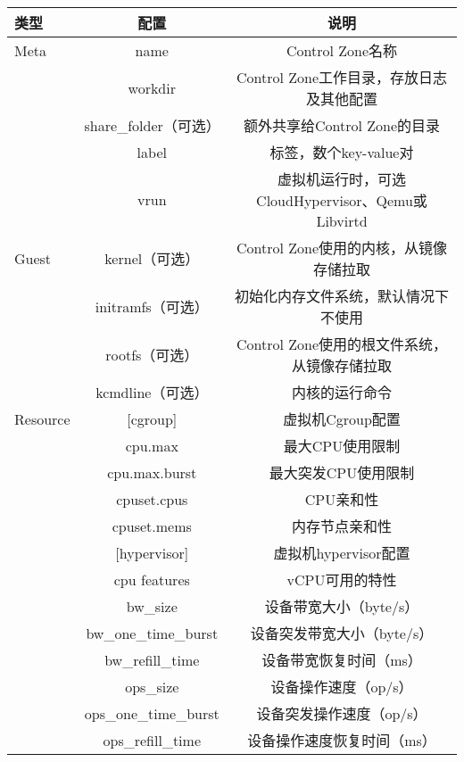 \begin{table}
    \label{tab:cz_config}
    \footnotesize%
    \setlength{\tabcolsep}{4pt}%
    \renewcommand{\arraystretch}{1.5}%
    \centering
    \begin{tabular}{lcc}
        \hline
        类型 & 配置 & 说明\\
        \hline
        Meta & name & Control Zone名称 \\
        & workdir & Control Zone工作目录，存放日志及其他配置 \\
        & share\_folder（可选） & 额外共享给Control Zone的目录 \\
        & label & 标签，数个key-value对 \\
        & vrun & 虚拟机运行时，可选CloudHypervisor、Qemu或Libvirtd \\
        Guest & kernel（可选） & Control Zone使用的内核，从镜像存储拉取 \\
        & initramfs（可选） & 初始化内存文件系统，默认情况下不使用 \\
        & rootfs（可选） & Control Zone使用的根文件系统，从镜像存储拉取\\
        & kcmdline（可选） & 内核的运行命令 \\
        Resource & [cgroup] & 虚拟机Cgroup配置 \\
        & cpu.max & 最大CPU使用限制 \\
        & cpu.max.burst & 最大突发CPU使用限制 \\
        & cpuset.cpus & CPU亲和性 \\
        & cpuset.mems & 内存节点亲和性 \\
        & [hypervisor] & 虚拟机hypervisor配置 \\
        & cpu features& vCPU可用的特性\\
        & bw\_size & 设备带宽大小（byte/s）\\
        & bw\_one\_time\_burst & 设备突发带宽大小（byte/s）\\
        & bw\_refill\_time & 设备带宽恢复时间（ms）\\
        & ops\_size & 设备操作速度（op/s）\\
        & ops\_one\_time\_burst & 设备突发操作速度（op/s）\\
        & ops\_refill\_time & 设备操作速度恢复时间（ms）\\
        \hline
    \end{tabular}
\end{table}

